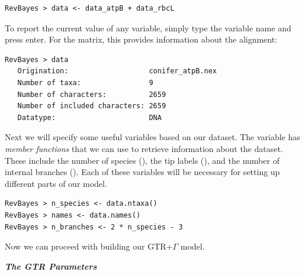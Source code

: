 {\tt \begin{snugshade*}
\begin{lstlisting}
RevBayes > data <- data_atpB + data_rbcL
\end{lstlisting}
\end{snugshade*}}

To report the current value of any variable, simply type the variable name and press enter. For the  matrix, this provides information about the alignment:


{\tt \begin{snugshade*}
\begin{lstlisting}
RevBayes > data
   Origination:                   conifer_atpB.nex
   Number of taxa:                9
   Number of characters:          2659
   Number of included characters: 2659
   Datatype:                      DNA
\end{lstlisting}
\end{snugshade*}}




Next we will specify some useful variables based on our dataset. The variable  has \textit{member functions} that we can use to retrieve information about the dataset. 
These include the number of species (), the tip labels (), and the number of internal branches ().
Each of these variables will be necessary for setting up different parts of our model.
{\tt \begin{snugshade*}
\begin{lstlisting}
RevBayes > n_species <- data.ntaxa()
RevBayes > names <- data.names()	
RevBayes > n_branches <- 2 * n_species - 3 
\end{lstlisting}
\end{snugshade*}}

Now we can proceed with building our GTR$+\Gamma$ model.

\textbf{\textit{The GTR Parameters}}

